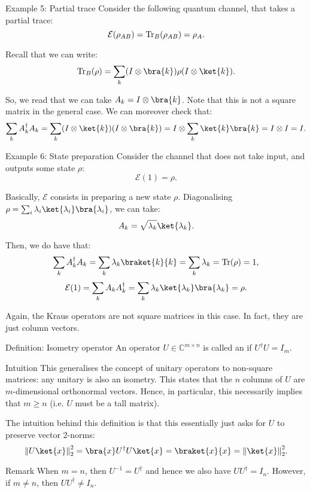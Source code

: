 \documentclass[a4paper]{article}
\begin{document}
\begin{parag}{Example 5: Partial trace}
    Consider the following quantum channel, that takes a partial trace: 
    \[\mathcal{E}\left(\rho_{AB}\right) = \Tr_B\left(\rho_{AB}\right) = \rho_A.\]
    
    Recall that we can write: 
    \[\Tr_B\left(\rho\right) = \sum_{k} \left(I \otimes \bra{k}\right) \rho \left(I \otimes \ket{k}\right).\]

    So, we read that we can take $A_k = I \otimes \bra{k}$. Note that this is not a square matrix in the general case. We can moreover check that: 
    \[\sum_{k} A_k^{\dagger} A_k = \sum_{k} \left(I \otimes \ket{k}\right)\left(I \otimes \bra{k}\right) = I \otimes \sum_{k} \ket{k}\bra{k} = I \otimes I = I.\]
\end{parag}

\begin{parag}{Example 6: State preparation}
    Consider the channel that does not take input, and outputs some state $\rho$: 
    \[\mathcal{E}\left(1\right) = \rho.\]

    Basically, $\mathcal{E}$ consists in preparing a new state $\rho$. Diagonalising $\rho = \sum_{i} \lambda_i \ket{\lambda_i}\bra{\lambda_i}$, we can take: 
    \[A_k = \sqrt{\lambda_k} \ket{\lambda_k}.\]
    
    Then, we do have that: 
    \[\sum_{k} A_k^{\dagger} A_k = \sum_{k} \lambda_k \braket{k}{k} = \sum_{k} \lambda_k = \Tr\left(\rho\right) = 1,\]
    \[\mathcal{E}\left(1\right) = \sum_{k} A_k A_k^{\dagger} = \sum_k \lambda_k \ket{\lambda_k}\bra{\lambda_k} = \rho.\]

    Again, the Kraus operators are not square matrices in this case. In fact, they are just column vectors.
\end{parag}

\begin{parag}{Definition: Isometry operator}
    An operator $U \in \mathbb{C}^{m \times n}$ is called an  if $U^{\dagger} U = I_m$.

    \begin{subparag}{Intuition}
        This generalises the concept of unitary operators to non-square matrices: any unitary is also an isometry. This states that the $n$ columns of $U$   are $m$-dimensional orthonormal vectors. Hence, in particular, this necessarily implies that $m \geq n$ (i.e. $U$ must be a tall matrix).

        The intuition behind this definition is that this essentially just asks for $U$ to preserve vector 2-norms:
        \[\left\|U \ket{x}\right\|_2^2 = \bra{x} U^{\dagger} U \ket{x} = \braket{x}{x} = \left\|\ket{x}\right\|_2^2.\]
    \end{subparag}

    \begin{subparag}{Remark}
        When $m = n$, then $U^{-1} = U^{\dagger}$ and hence we also have $U U^{\dagger} = I_n$. However, if $m \neq n$, then $U U^{\dagger} \neq I_n$.
    \end{subparag}
\end{parag}
\end{document}

